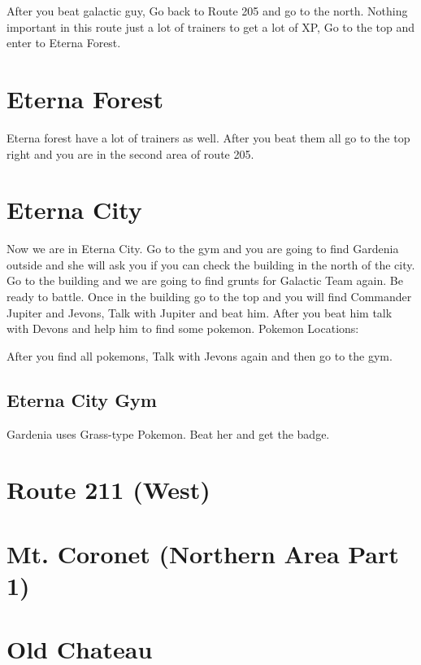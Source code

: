 \documentclass[11pt]{article}
\begin{document}
After you beat galactic guy, Go back to Route 205 and go to the north.
Nothing important in this route just a lot of trainers to get a lot of XP,
Go to the top and enter to Eterna Forest.



\section{Eterna Forest}\label{sec:Eterna_Forest}

Eterna forest have a lot of trainers as well.
After you beat them all go to the top right and you are in the second area of route 205.



\section{Eterna City}\label{sec:eterna-city}
Now we are in Eterna City.
Go to the gym and you are going to find Gardenia outside and she will ask you
if you can check the building in the north of the city.
Go to the building and we are going to find grunts for Galactic Team again.
Be ready to battle.
Once in the building go to the top and you will find
Commander Jupiter and Jevons, Talk with Jupiter and beat him.
After you beat him talk with Devons and help him to find some pokemon.
Pokemon Locations:

After you find all pokemons, Talk with Jevons again and then go to the gym.

\subsection{Eterna City Gym}\label{subsec:eterna-city-gym}
Gardenia uses Grass-type Pokemon.
Beat her and get the badge.

\section{Route 211 (West)}
\label{sec:Route_211}


\section{Mt. Coronet (Northern Area Part 1)}
\label{sec:Mt._Coronet}


\section{Old Chateau}
\label{sec:Old_Chateau}

\end{document}

